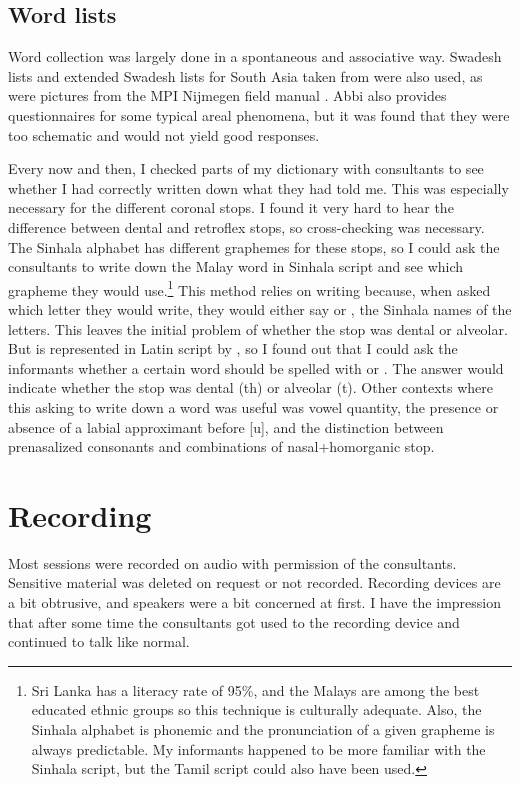 \subsection{Word lists}
Word collection was largely done in a spontaneous and associative way. Swadesh lists and extended Swadesh lists for South Asia taken from \citet{Abbi2001} were also used, as were pictures from the MPI Nijmegen field manual \citep{Fieldmanual2001}. Abbi also provides questionnaires for some typical areal phenomena, but it was found that they were too schematic and would not yield good responses.

Every now and then, I checked parts of my dictionary with consultants to see whether I had correctly written down what they had told me. This was especially necessary for the different coronal stops. I found it very hard to hear the difference between dental and retroflex stops, so cross-checking was necessary. The Sinhala alphabet has different graphemes for  these stops, so I could ask the consultants to write down the Malay word in Sinhala script and see which grapheme they would use.\footnote{Sri Lanka has a literacy rate of 95\%, and the Malays are among the best educated ethnic groups so this technique is culturally adequate. Also, the Sinhala alphabet is phonemic and the pronunciation of a given grapheme is always predictable. My informants happened to be more familiar with the Sinhala script, but the Tamil script could also have been used.}
This method relies on writing because, when asked which letter they would write, they would either say  or , the Sinhala names of the letters. This leaves the initial problem of whether the stop was dental or alveolar. But  is represented in Latin script by , so I found out that I could ask the informants whether a certain word should be spelled with  or . The answer would indicate whether the stop was dental (th) or alveolar (t).
Other contexts where this asking to write down a word was useful was vowel quantity, the presence or absence of a labial approximant before [u], and the distinction between prenasalized consonants and combinations of nasal+homorganic stop.

\section{Recording}
Most sessions were recorded on audio with permission of the consultants. Sensitive material was deleted on request or not recorded. Recording devices are a bit obtrusive, and speakers were a bit concerned at first. I have the impression that after some time the consultants got used to the recording device and continued to talk  like normal.

